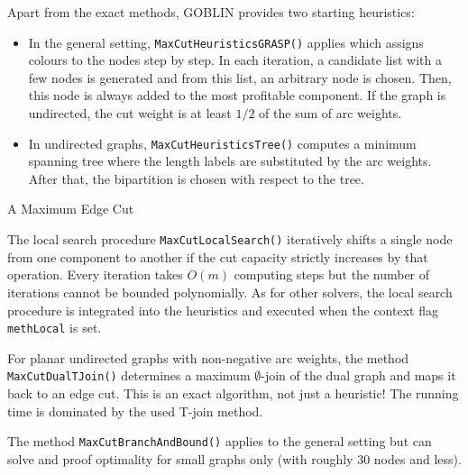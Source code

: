 \documentclass[a4paper,11pt,twoside]{book}
\begin{document}
\begin{multicols}{2}
Apart from the exact methods, GOBLIN provides two starting heuristics:
\begin{itemize}
\item In the general setting, \verb/MaxCutHeuristicsGRASP()/ applies which
    assigns colours to the nodes step by step. In each iteration, a candidate
    list with a few nodes is generated and from this list, an arbitrary node
    is chosen. Then, this node is always added to the most profitable component.
    If the graph is undirected, the cut weight is at least $1/2$ of the sum of
    arc weights.
\item In undirected graphs, \verb/MaxCutHeuristicsTree()/ computes a minimum
    spanning tree where the length labels are substituted by the arc weights.
    After that, the bipartition is chosen with respect to the tree.
\end{itemize}

\bigskip
\begin{figurehere}
\begin{center}
\epsfxsize=10cm
\vspace{0.5cm}
\caption{\label{flb_maxcut}A Maximum Edge Cut}
\end{center}
\end{figurehere}

\noindent
The local search procedure \verb/MaxCutLocalSearch()/ iteratively shifts a
single node from one component to another if the cut capacity strictly
increases by that operation. Every iteration takes $O(m)$ computing steps but
the number of iterations cannot be bounded polynomially. As for other solvers,
the local search procedure is integrated into the heuristics and executed when
the context flag \verb/methLocal/ is set.

For planar undirected graphs with non-negative arc weights, the method
\verb/MaxCutDualTJoin()/ determines a maximum $\emptyset$-join of the dual
graph and maps it back to an edge cut. This is an exact algorithm, not just
a heuristic! The running time is dominated by the used T-join method.

The method \verb/MaxCutBranchAndBound()/ applies to the general setting but
can solve and proof optimality for small graphs only (with roughly 30 nodes
and less).



\end{multicols}
\end{document}
